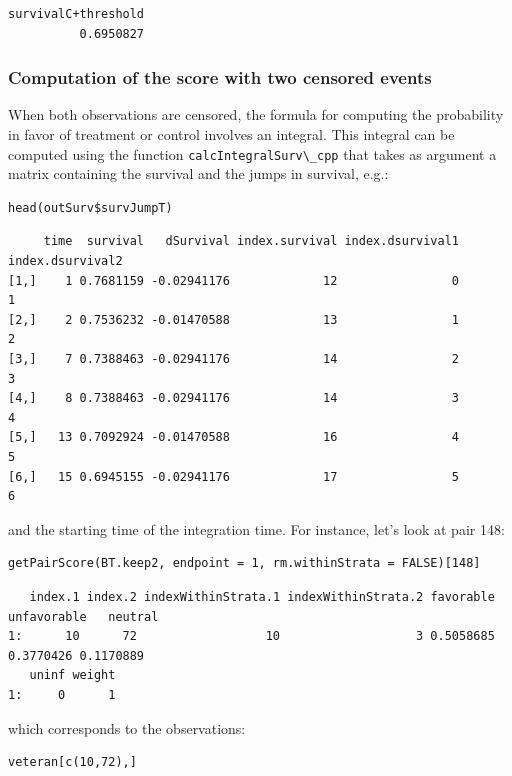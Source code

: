 \documentclass[12pt]{article}
\begin{document}
\begin{verbatim}
survivalC+threshold 
          0.6950827
\end{verbatim}

\subsubsection{Computation of the score with two censored events}
\label{sec:org673cb33}

When both observations are censored, the formula for computing the
probability in favor of treatment or control involves an
integral. This integral can be computed using the function
\texttt{calcIntegralSurv\textbackslash{}\_cpp} that takes as argument a matrix containing the
survival and the jumps in survival, e.g.:
\lstset{language=r,label= ,caption= ,captionpos=b,numbers=none}
\begin{lstlisting}
head(outSurv$survJumpT)
\end{lstlisting}

\begin{verbatim}
     time  survival   dSurvival index.survival index.dsurvival1 index.dsurvival2
[1,]    1 0.7681159 -0.02941176             12                0                1
[2,]    2 0.7536232 -0.01470588             13                1                2
[3,]    7 0.7388463 -0.02941176             14                2                3
[4,]    8 0.7388463 -0.02941176             14                3                4
[5,]   13 0.7092924 -0.01470588             16                4                5
[6,]   15 0.6945155 -0.02941176             17                5                6
\end{verbatim}


and the starting time of the integration time. For instance, let's
look at pair 148:
\lstset{language=r,label= ,caption= ,captionpos=b,numbers=none}
\begin{lstlisting}
getPairScore(BT.keep2, endpoint = 1, rm.withinStrata = FALSE)[148]
\end{lstlisting}

\begin{verbatim}
   index.1 index.2 indexWithinStrata.1 indexWithinStrata.2 favorable unfavorable   neutral
1:      10      72                  10                   3 0.5058685   0.3770426 0.1170889
   uninf weight
1:     0      1
\end{verbatim}


which corresponds to the observations:
\lstset{language=r,label= ,caption= ,captionpos=b,numbers=none}
\begin{lstlisting}
veteran[c(10,72),]
\end{lstlisting}
\end{document}
